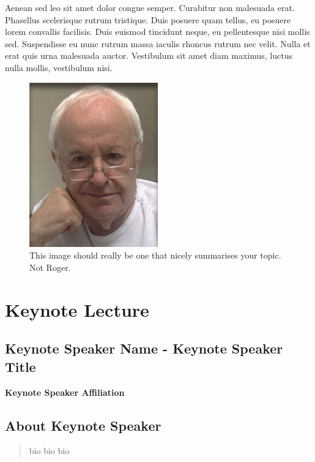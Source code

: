 \documentclass[12pt,]{book}
\begin{document}
Aenean sed leo sit amet dolor congue semper. Curabitur non malesuada
erat. Phasellus scelerisque rutrum tristique. Duis posuere quam tellus,
eu posuere lorem convallis facilisis. Duis euismod tincidunt neque, eu
pellentesque nisi mollis sed. Suspendisse eu nunc rutrum massa iaculis
rhoncus rutrum nec velit. Nulla et erat quis urna malesuada auctor.
Vestibulum sit amet diam maximus, luctus nulla mollis, vestibulum nisi.

\begin{figure}
\includegraphics[width=2.19in]{assets/RPF-thumbnail} \caption{This image should really be one that nicely summarises your topic. Not Roger.}\label{fig:mainp}
\end{figure}

\section*{Keynote Lecture}\label{keynote-lecture-6}

\subsection*{Keynote Speaker Name - Keynote Speaker
Title}\label{keynote-speaker-name---keynote-speaker-title-2}

\textbf{Keynote Speaker Affiliation}

\subsection*{About Keynote Speaker}\label{about-keynote-speaker-2}

\begin{quote}
bio bio bio
\end{quote}
\end{document}
